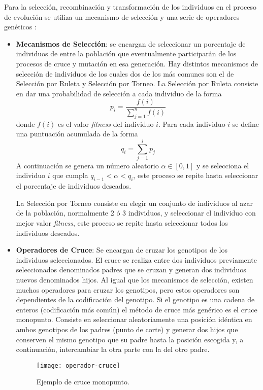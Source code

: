 Para la selección, recombinación y transformación de los individuos en el proceso de evolución se utiliza un mecanismo de selección y una serie de operadores genéticos \cite{cervigon09}:

\begin{itemize}
\item \textbf{Mecanismos de Selección}: se encargan  de seleccionar un porcentaje de individuos de entre la población que eventualmente participarán de los procesos de cruce y mutación en esa generación. Hay distintos mecanismos de selección de individuos de los cuales dos de los más comunes son el de Selección por Ruleta y Selección por Torneo. La Selección por Ruleta consiste en dar una probabilidad de selección a cada individuo de la forma
\begin{equation*}
p_i = \frac{f(i)}{\sum\limits_{j=1}^n f(i)}
\end{equation*}
donde $f(i)$ es el valor \textit{fitness} del individuo $i$. Para cada individuo $i$ se define una puntuación acumulada de la forma
\begin{equation*}
q_i = \sum\limits_{j=1}^i p_j
\end{equation*}
A continuación se genera un número aleatorio $\alpha \in [0,1]$ y se selecciona el individuo $i$ que cumpla $q_{i-1} < \alpha < q_i$, este proceso se repite hasta seleccionar el porcentaje de individuos deseados. 

La Selección por Torneo consiste en elegir un conjunto de individuos al azar de la población, normalmente 2 ó 3 individuos, y seleccionar el individuo con mejor valor \textit{fitness}, este proceso se repite hasta seleccionar todos los individuos deseados.

\item \textbf{Operadores de Cruce}: Se encargan de cruzar los genotipos de los individuos seleccionados. El cruce se realiza entre dos individuos previamente seleccionados denominados padres que se cruzan y generan dos individuos nuevos denominados hijos. Al igual que los mecanismos de selección, existen muchos operadores  para cruzar los genotipos, pero estos operadores son dependientes de la codificación del genotipo. Si el genotipo es una cadena de enteros (codificación más común) el método de cruce más genérico es el cruce monopunto. Consiste en seleccionar aleatoriamente una posición idéntica en ambos genotipos de los padres (punto de corte) y generar dos hijos que conserven el mismo genotipo que su padre hasta la posición escogida y, a continuación, intercambiar la otra parte con la del otro padre.
\begin{figure}[H]
\centering
\texttt{[image: operador-cruce]}
\caption{Ejemplo de cruce monopunto.}
\end{figure}


\end{itemize}
